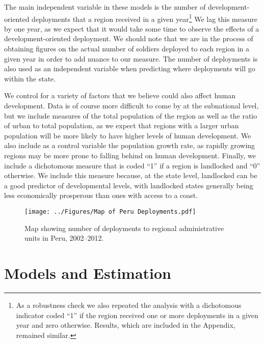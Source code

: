 \documentclass[12pt]{article}
\begin{document}
\begin{doublespace}
The main independent variable in these models is the number of development-oriented deployments that a region received in a given year\footnote{As a robustness check we also repeated the analysis with a dichotomous indicator coded ``1'' if the region received one or more deployments in a given year and zero otherwise.  Results, which are included in the Appendix, remained similar.}  We lag this measure by one year, as we expect that it would take some time to observe the effects of a development-oriented deployment. We should note that we are in the process of obtaining figures on the actual number of soldiers deployed to each region in a given year in order to add nuance to our measure.  The number of deployments is also used as an independent variable when predicting where deployments will go within the state. 

We control for a variety of factors that we believe could also affect human development.  Data is of course more difficult to come by at the subnational level, but we include measures of the total population of the region as well as the ratio of urban to total population, as we expect that regions with a larger urban population will be more likely to have higher levels of human development.  We also include as a control variable the population growth rate, as rapidly growing regions may be more prone to falling behind on human development.  Finally, we include a dichotomous measure that is coded ``1'' if a region is landlocked and ``0'' otherwise.  We include this measure because, at the state level, landlocked can be a good predictor of developmental levels, with landlocked states generally being less economically prosperous than ones with access to a coast. 




\begin{figure}[t]
\begin{center}
\texttt{[image: ../Figures/Map of Peru Deployments.pdf]}
\caption{Map showing number of deployments to regional administrative units in Peru, 2002--2012.}
\label{fig:mapperu}
\end{center}
\end{figure}


\section{Models and Estimation}


\end{doublespace}
\end{document}
